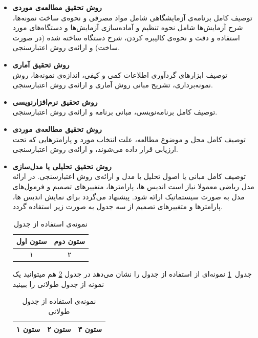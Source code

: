 \begin{itemize}[leftmargin=*] %

    \item \textbf{روش تحقیق مطالعه‌ی موردی} \\
    توصیف کامل برنامه‌ی آزمایشگاهی شامل مواد مصرفی و نحوه‌ی ساخت نمونه‌ها، شرح آزمایش‌ها شامل نحوه تنظیم و آماده‌سازی آزمایش‌ها و دستگاه‌های مورد استفاده و دقت و نحوه‌ی کالیبره کردن، شرح دستگاه ساخته شده (در صورت ساخت) و ارائه‌ی روش اعتبارسنجی.
    \item \textbf{روش تحقیق آماری} \\
    توصیف ابزارهای گردآوری اطلاعات کمی و کیفی، اندازه‌ی نمونه‌ها، روش نمونه‌برداری، تشریح مبانی روش آماری و ارائه‌ی روش اعتبارسنجی.
    \item \textbf{روش تحقیق نرم‌افزارنويسی} \\
    توصیف کامل برنامه‌نویسی، مبانی برنامه و ارائه‌ی روش اعتبارسنجی.

    \item \textbf{روش تحقیق مطالعه‌ی موردی} \\
    توصیف کامل محل و موضوع مطالعه، علت انتخاب مورد و پارامترهایی که تحت ارزیابی قرار داده می‌شوند، و ارائه‌ی روش اعتبارسنجی.
    \item \textbf{روش تحقیق تحلیلی يا مدل‌سازی} \\
    توصیف کامل مبانی یا اصول تحلیل یا مدل و ارائه‌ی روش اعتبارسنجی. در ارائه مدل ریاضی معمولا نیاز است اندیس ها، پارامترها، متغییرهای تصمیم و فرمول‌های مدل به صورت سیستماتیک ارائه شود. پیشنهاد می‌گردد برای نمایش اندیس ها، پارامتر‌ها و متغییرهای تصمیم از سه جدول به صورت زیر استفاده گردد.
    
    \begin{table}[h] %
    \centering
    \caption{نمونه‌ی استفاده از جدول}
    \label{table:example}
    \begin{tabular}{cc}
    \hline
    ستون اول & ستون دوم \\
    \hline
    ۱ & ۲ \\
    \hline
    \end{tabular}
    \end{table}

    جدول~\ref{table:example} نمونه‌ای از استفاده از جدول را نشان می‌دهد در جدول \ref{longtable:example} هم میتوانید یک نمونه از جدول طولانی را ببینید


    \begin{longtable}{|c|c|c|} %
    \caption{نمونه‌ی استفاده از جدول طولانی} \\
    \label{longtable:example}
    \hline
    ستون ۱ & ستون ۲ & ستون ۳ \\
    \hline
    \endfirsthead


\end{longtable}
\end{itemize}
